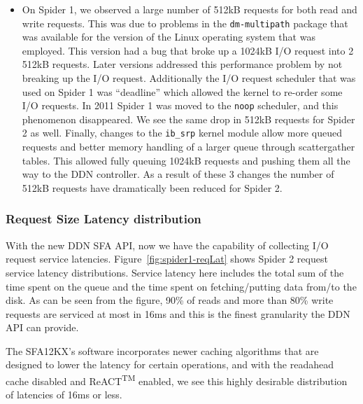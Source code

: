 \begin{itemize}
\item   On Spider 1, we observed a large number of 512kB requests for both read
and write requests. This was due to problems in the {\tt dm-multipath} \cite
{mpath}
package that was available for the version of the Linux operating system that
was employed. This version had a bug that broke up a 1024kB I/O request into 2
512kB requests. Later versions addressed this performance problem by not
breaking up the I/O request. Additionally the I/O request scheduler that was
used on Spider 1 was ``deadline'' which allowed the kernel to re-order some I/O
requests.  In 2011 Spider 1 was moved to the  {\tt noop} scheduler, and this
phenomenon disappeared. We see the same drop in 512kB requests for Spider 2 as
well. Finally, changes to the {\tt ib\_srp} kernel module allow more queued
requests
and better memory handling of a larger queue through scatter\/gather tables.
This allowed fully queuing 1024kB requests and pushing them all the way to the
DDN controller. As a result of these 3 changes the number of 512kB requests
have dramatically been reduced for Spider 2.  \end{itemize}

\subsubsection{Request Size Latency distribution}

With the new DDN SFA API, now we have the capability of collecting I/O request
service latencies. Figure~\ref{fig:spider1-reqLat} shows Spider 2 request
service latency distributions. Service latency here includes the total sum of
the time spent on the queue and the time spent on fetching/putting data from/to
the disk. As can be seen from the figure, 90\% of reads and more than 80\%
write requests are serviced at most in 16ms and this is the finest granularity
the DDN API can provide. 

The SFA12KX's software incorporates newer caching algorithms that are designed
to lower the latency for certain operations, and with the readahead cache
disabled and ReACT\textsuperscript{TM} enabled, we see this highly desirable
distribution of latencies of 16ms or less.

